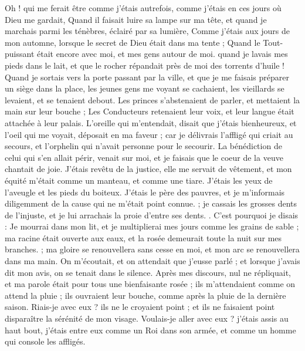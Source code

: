 \begin{multicols}{2}
Oh ! qui me ferait être comme j'étais autrefois, comme j'étais en ces jours où Dieu me gardait,
Quand il faisait luire sa lampe sur ma tête, et quand je marchais parmi les ténèbres, éclairé par sa lumière,
Comme j'étais aux jours de mon automne, lorsque le secret de Dieu était dans ma tente ;
Quand le Tout-puissant était encore avec moi, et mes gens autour de moi.
quand je lavais mes pieds dans le lait, et que le rocher répandait près de moi des torrents d'huile !
Quand je sortais vers la porte passant par la ville, et que je me faisais préparer un siège dans la place,
les jeunes gens me voyant se cachaient, les vieillards se levaient, et se tenaient debout.
Les princes s'abstenaient de parler, et mettaient la main sur leur bouche ;
Les Conducteurs retenaient leur voix, et leur langue était attachée à leur palais.
L'oreille qui m'entendait, disait que j'étais bienheureux, et l'oeil qui me voyait, déposait en ma faveur ;
car je délivrais l'affligé qui criait au secours, et l'orphelin qui n'avait personne pour le secourir.
La bénédiction de celui qui s'en allait périr, venait sur moi, et je faisais que le coeur de la veuve chantait de joie.
J'étais revêtu de la justice, elle me servait de vêtement, et mon équité m'était comme un manteau, et comme une tiare.
J'étais les yeux de l'aveugle et les pieds du boiteux.
J'étais le père des pauvres, et je m'informais diligemment de la cause qui ne m'était point connue. ;
je cassais les grosses dents de l'injuste, et je lui arrachais la proie d'entre ses dents. .
C'est pourquoi je disais : Je mourrai dans mon lit, et je multiplierai mes jours comme les grains de sable ;
ma racine était ouverte aux eaux, et la rosée demeurait toute la nuit sur mes branches. ;
ma gloire se renouvellera sans cesse en moi, et mon arc se renouvellera dans ma main.
On m'écoutait, et on attendait que j'eusse parlé ; et lorsque j'avais dit mon avis, on se tenait dans le silence.
Après mes discours, nul ne répliquait, et ma parole était pour tous une bienfaisante rosée ;
ils m'attendaient comme on attend la pluie ; ils ouvraient leur bouche, comme après la pluie de la dernière saison.
Riais-je avec eux ? ils ne le croyaient point ; et ils ne faisaient point disparaître la sérénité de mon visage.
Voulais-je aller avec eux ? j'étais assis au haut bout, j'étais entre eux comme un Roi dans son armée, et comme un homme qui console les affligés.

\end{multicols}
